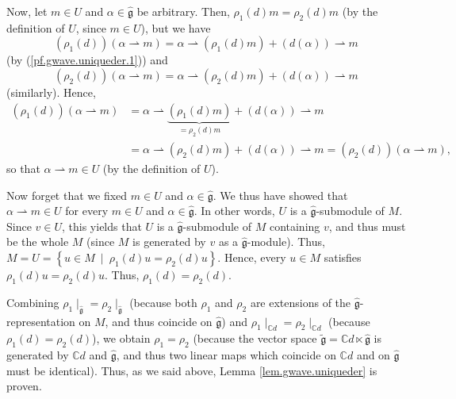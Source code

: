 \documentclass[etingof-lie.tex]{subfiles}
\begin{document}
Now, let $m\in U$ and $\alpha\in\widehat{\mathfrak{g}}$ be arbitrary. Then,
$\rho_{1}\left(  d\right)  m=\rho_{2}\left(  d\right)  m$ (by the definition
of $U$, since $m\in U$), but we have%
\[
\left(  \rho_{1}\left(  d\right)  \right)  \left(  \alpha\rightharpoonup
m\right)  =\alpha\rightharpoonup\left(  \rho_{1}\left(  d\right)  m\right)
+\left(  d\left(  \alpha\right)  \right)  \rightharpoonup m
\]
(by (\ref{pf.gwave.uniqueder.1})) and%
\[
\left(  \rho_{2}\left(  d\right)  \right)  \left(  \alpha\rightharpoonup
m\right)  =\alpha\rightharpoonup\left(  \rho_{2}\left(  d\right)  m\right)
+\left(  d\left(  \alpha\right)  \right)  \rightharpoonup m
\]
(similarly). Hence,%
\begin{align*}
\left(  \rho_{1}\left(  d\right)  \right)  \left(  \alpha\rightharpoonup
m\right)   &  =\alpha\rightharpoonup\underbrace{\left(  \rho_{1}\left(
d\right)  m\right)  }_{=\rho_{2}\left(  d\right)  m}+\left(  d\left(
\alpha\right)  \right)  \rightharpoonup m\\
&  =\alpha\rightharpoonup\left(  \rho_{2}\left(  d\right)  m\right)  +\left(
d\left(  \alpha\right)  \right)  \rightharpoonup m=\left(  \rho_{2}\left(
d\right)  \right)  \left(  \alpha\rightharpoonup m\right)  ,
\end{align*}
so that $\alpha\rightharpoonup m\in U$ (by the definition of $U$).

Now forget that we fixed $m\in U$ and $\alpha\in\widehat{\mathfrak{g}}$. We
thus have showed that $\alpha\rightharpoonup m\in U$ for every $m\in U$ and
$\alpha\in\widehat{\mathfrak{g}}$. In other words, $U$ is a
$\widehat{\mathfrak{g}}$-submodule of $M$. Since $v\in U$, this yields that
$U$ is a $\widehat{\mathfrak{g}}$-submodule of $M$ containing $v$, and thus
must be the whole $M$ (since $M$ is generated by $v$ as a
$\widehat{\mathfrak{g}}$-module). Thus, $M=U=\left\{  u\in M\ \mid\ \rho
_{1}\left(  d\right)  u=\rho_{2}\left(  d\right)  u\right\}  $. Hence, every
$u\in M$ satisfies $\rho_{1}\left(  d\right)  u=\rho_{2}\left(  d\right)  u$.
Thus, $\rho_{1}\left(  d\right)  =\rho_{2}\left(  d\right)  $.

Combining $\rho_{1}\mid_{\widehat{\mathfrak{g}}}=\rho_{2}\mid
_{\widehat{\mathfrak{g}}}$ (because both $\rho_{1}$ and $\rho_{2}$ are
extensions of the $\widehat{\mathfrak{g}}$-representation on $M$, and thus
coincide on $\widehat{\mathfrak{g}}$) and $\rho_{1}\mid_{\mathbb{C}d}=\rho
_{2}\mid_{\mathbb{C}d}$ (because $\rho_{1}\left(  d\right)  =\rho_{2}\left(
d\right)  $), we obtain $\rho_{1}=\rho_{2}$ (because the vector space
$\widetilde{\mathfrak{g}}=\mathbb{C}d\ltimes\widehat{\mathfrak{g}}$ is
generated by $\mathbb{C}d$ and $\widehat{\mathfrak{g}}$, and thus two linear
maps which coincide on $\mathbb{C}d$ and on $\widehat{\mathfrak{g}}$ must be
identical). Thus, as we said above, Lemma \ref{lem.gwave.uniqueder} is proven.
\end{document}
